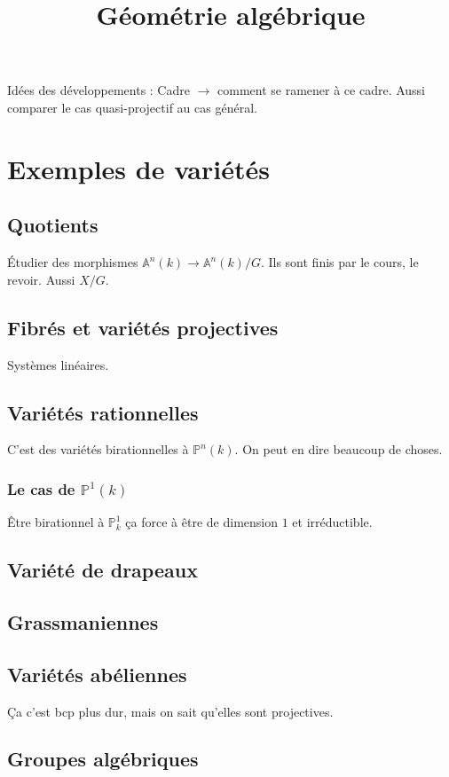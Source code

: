 \documentclass[a4paper,12pt]{book}
\title{Géométrie algébrique}
\date{}
\newcommand{\A}{\mathbb{A}}
\renewcommand{\P}{\mathbb{P}}
\theoremstyle{plain}
\theoremstyle{definition}
\theoremstyle{remark}
\begin{document}
\maketitle
\tableofcontents



Idées des développements : Cadre $\to$ comment se ramener à ce cadre.
Aussi comparer le cas quasi-projectif au cas général.

\chapter{Exemples de variétés}
\section{Quotients}
Étudier des morphismes $\A^n(k)\to \A^n(k)/G$. Ils sont finis par 
le cours, le revoir. Aussi $X/G$.

\section{Fibrés et variétés projectives}
Systèmes linéaires.

\section{Variétés rationnelles}
C'est des variétés birationnelles à $\P^n(k)$. On peut en dire 
beaucoup de choses.
\subsection*{Le cas de $\P^1(k)$}
Être birationnel à $\P^1_k$ ça force à être de dimension $1$ et 
irréductible.


\section{Variété de drapeaux}
\section{Grassmaniennes}
\section{Variétés abéliennes}
Ça c'est bcp plus dur, mais on sait qu'elles sont projectives.
\section{Groupes algébriques}
\end{document}
